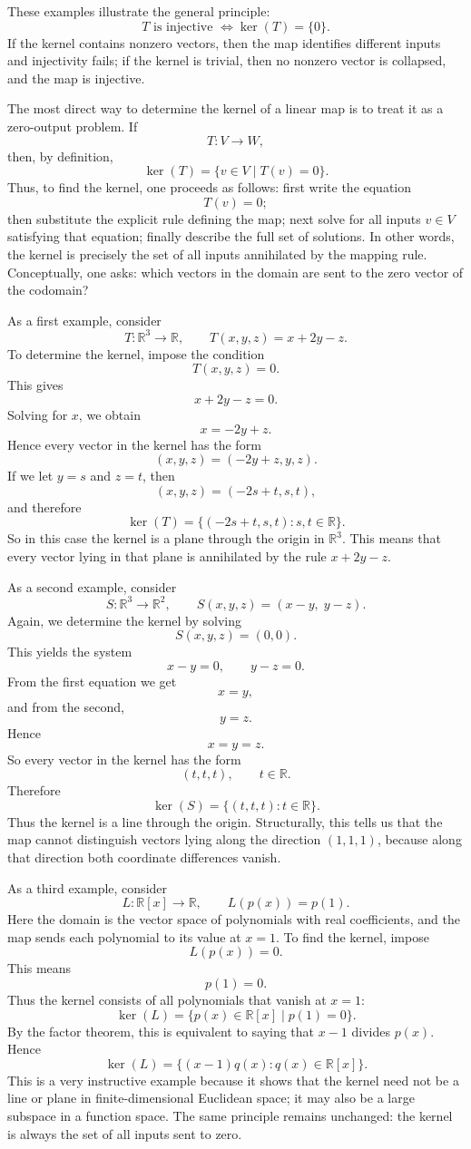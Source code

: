 \documentclass[12pt]{article}
\begin{document}
	These examples illustrate the general principle:
	\[
	T \text{ is injective } \iff \ker(T)=\{0\}.
	\]
	If the kernel contains nonzero vectors, then the map identifies different inputs and injectivity fails; if the kernel is trivial, then no nonzero vector is collapsed, and the map is injective.
	
	The most direct way to determine the kernel of a linear map is to treat it as a zero-output problem. If
	\[
	T:V\to W,
	\]
	then, by definition,
	\[
	\ker(T)=\{v\in V\mid T(v)=0\}.
	\]
	Thus, to find the kernel, one proceeds as follows: first write the equation
	\[
	T(v)=0;
	\]
	then substitute the explicit rule defining the map; next solve for all inputs \(v\in V\) satisfying that equation; finally describe the full set of solutions. In other words, the kernel is precisely the set of all inputs annihilated by the mapping rule. Conceptually, one asks: which vectors in the domain are sent to the zero vector of the codomain?
	
	As a first example, consider
	\[
	T:\mathbb{R}^3\to\mathbb{R},\qquad T(x,y,z)=x+2y-z.
	\]
	To determine the kernel, impose the condition
	\[
	T(x,y,z)=0.
	\]
	This gives
	\[
	x+2y-z=0.
	\]
	Solving for \(x\), we obtain
	\[
	x=-2y+z.
	\]
	Hence every vector in the kernel has the form
	\[
	(x,y,z)=(-2y+z,y,z).
	\]
	If we let \(y=s\) and \(z=t\), then
	\[
	(x,y,z)=(-2s+t,s,t),
	\]
	and therefore
	\[
	\ker(T)=\{(-2s+t,s,t):s,t\in\mathbb{R}\}.
	\]
	So in this case the kernel is a plane through the origin in \(\mathbb{R}^3\). This means that every vector lying in that plane is annihilated by the rule \(x+2y-z\).
	
	As a second example, consider
	\[
	S:\mathbb{R}^3\to\mathbb{R}^2,\qquad S(x,y,z)=(x-y,\;y-z).
	\]
	Again, we determine the kernel by solving
	\[
	S(x,y,z)=(0,0).
	\]
	This yields the system
	\[
	x-y=0,\qquad y-z=0.
	\]
	From the first equation we get
	\[
	x=y,
	\]
	and from the second,
	\[
	y=z.
	\]
	Hence
	\[
	x=y=z.
	\]
	So every vector in the kernel has the form
	\[
	(t,t,t),\qquad t\in\mathbb{R}.
	\]
	Therefore
	\[
	\ker(S)=\{(t,t,t):t\in\mathbb{R}\}.
	\]
	Thus the kernel is a line through the origin. Structurally, this tells us that the map cannot distinguish vectors lying along the direction \((1,1,1)\), because along that direction both coordinate differences vanish.
	
	As a third example, consider
	\[
	L:\mathbb{R}[x]\to\mathbb{R},\qquad L(p(x))=p(1).
	\]
	Here the domain is the vector space of polynomials with real coefficients, and the map sends each polynomial to its value at \(x=1\). To find the kernel, impose
	\[
	L(p(x))=0.
	\]
	This means
	\[
	p(1)=0.
	\]
	Thus the kernel consists of all polynomials that vanish at \(x=1\):
	\[
	\ker(L)=\{p(x)\in\mathbb{R}[x]\mid p(1)=0\}.
	\]
	By the factor theorem, this is equivalent to saying that \(x-1\) divides \(p(x)\). Hence
	\[
	\ker(L)=\{(x-1)q(x):q(x)\in\mathbb{R}[x]\}.
	\]
	This is a very instructive example because it shows that the kernel need not be a line or plane in finite-dimensional Euclidean space; it may also be a large subspace in a function space. The same principle remains unchanged: the kernel is always the set of all inputs sent to zero.
	
\end{document}
